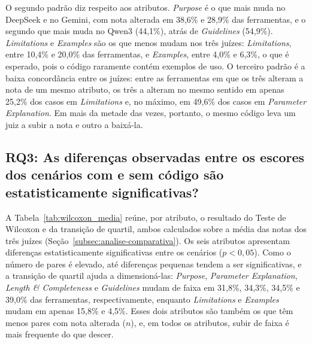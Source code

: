 O segundo padrão diz respeito aos atributos. \textit{Purpose} é o que mais muda no DeepSeek e no Gemini, com nota alterada em 38,6\% e 28,9\% das ferramentas, e o segundo que mais muda no Qwen3 (44,1\%), atrás de \textit{Guidelines} (54,9\%). \textit{Limitations} e \textit{Examples} são os que menos mudam nos três juízes: \textit{Limitations}, entre 10,4\% e 20,0\% das ferramentas, e \textit{Examples}, entre 4,0\% e 6,3\%, o que é esperado, pois o código raramente contém exemplos de uso. O terceiro padrão é a baixa concordância entre os juízes: entre as ferramentas em que os três alteram a nota de um mesmo atributo, os três a alteram no mesmo sentido em apenas 25,2\% dos casos em \textit{Limitations} e, no máximo, em 49,6\% dos casos em \textit{Parameter Explanation}. Em mais da metade das vezes, portanto, o mesmo código leva um juiz a subir a nota e outro a baixá-la.

\subsection{RQ3: As diferenças observadas entre os escores dos cenários com e sem código são estatisticamente significativas?}
\label{subsec:rq3}

A Tabela~\ref{tab:wilcoxon_media} reúne, por atributo, o resultado do Teste de Wilcoxon e da transição de quartil, ambos calculados sobre a média das notas dos três juízes (Seção~\ref{subsec:analise-comparativa}). Os seis atributos apresentam diferenças estatisticamente significativas entre os cenários ($p < 0{,}05$). Como o número de pares é elevado, até diferenças pequenas tendem a ser significativas, e a transição de quartil ajuda a dimensioná-las: \textit{Purpose}, \textit{Parameter Explanation}, \textit{Length \& Completeness} e \textit{Guidelines} mudam de faixa em 31,8\%, 34,3\%, 34,5\% e 39,0\% das ferramentas, respectivamente, enquanto \textit{Limitations} e \textit{Examples} mudam em apenas 15,8\% e 4,5\%. Esses dois atributos são também os que têm menos pares com nota alterada ($n$), e, em todos os atributos, subir de faixa é mais frequente do que descer.

